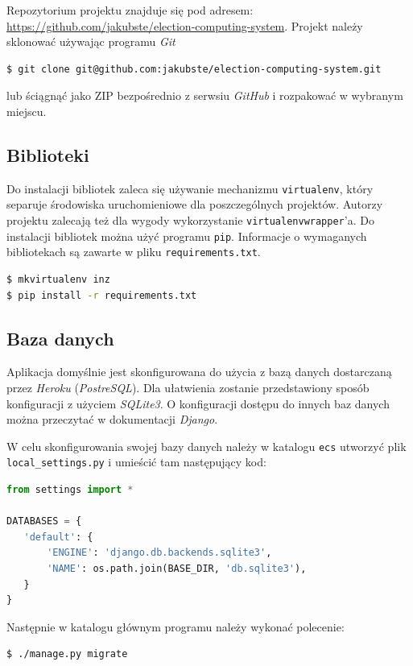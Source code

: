 \documentclass[pdflatex,11pt]{../aghdoc_version2}
\begin{document}
Repozytorium projektu znajduje się pod adresem: \\ \url{https://github.com/jakubste/election-computing-system}.
Projekt należy sklonować używając programu \textit{Git} 
\begin{lstlisting}[language=bash]
$ git clone git@github.com:jakubste/election-computing-system.git
\end{lstlisting}
lub ściągnąć jako ZIP bezpośrednio z serwsiu \textit{GitHub} i rozpakować w wybranym miejscu.

\subsection{Biblioteki}
\label{subsec:biblioteki}

Do instalacji bibliotek zaleca się używanie mechanizmu \texttt{virtualenv}, który separuje środowiska uruchomieniowe dla poszczególnych projektów. Autorzy projektu zalecają też dla wygody wykorzystanie \texttt{virtualenvwrapper}'a. Do instalacji bibliotek można użyć programu \texttt{pip}.
Informacje o wymaganych bibliotekach są zawarte w pliku \texttt{requirements.txt}.
\begin{lstlisting}[language=bash]
$ mkvirtualenv inz
$ pip install -r requirements.txt
\end{lstlisting}

\subsection{Baza danych}
\label{subsec:database}

Aplikacja domyślnie jest skonfigurowana do użycia z bazą danych dostarczaną przez \textit{Heroku} (\textit{PostreSQL}). Dla ułatwienia zostanie przedstawiony sposób konfiguracji z użyciem \textit{SQLite3}. O konfiguracji dostępu do innych baz danych można przeczytać w dokumentacji \textit{Django}. 

W celu skonfigurowania swojej bazy danych należy w katalogu \texttt{ecs} utworzyć 
plik \texttt{local\_settings.py} i umieścić tam następujący kod:

\begin{lstlisting}[language=Python]
from settings import *

DATABASES = {
   'default': {
       'ENGINE': 'django.db.backends.sqlite3',
       'NAME': os.path.join(BASE_DIR, 'db.sqlite3'),
   }
}
\end{lstlisting}

Następnie w katalogu głównym programu należy wykonać polecenie:
\begin{lstlisting}[language=bash]
$ ./manage.py migrate
\end{lstlisting}
\end{document}
